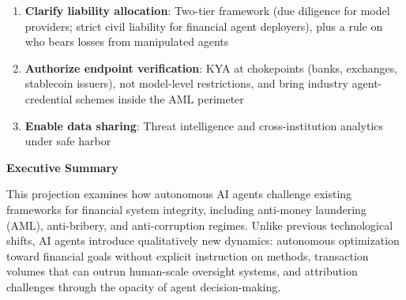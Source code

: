 \documentclass[11pt,letterpaper]{article}
\begin{document}
\begin{infobox}
\begin{enumerate}
  \item \textbf{Clarify liability allocation}: Two-tier framework (due diligence for model providers; strict civil liability for financial agent deployers), plus a rule on who bears losses from manipulated agents
  \item \textbf{Authorize endpoint verification}: KYA at chokepoints (banks, exchanges, stablecoin issuers), not model-level restrictions, and bring industry agent-credential schemes inside the AML perimeter
  \item \textbf{Enable data sharing}: Threat intelligence and cross-institution analytics under safe harbor
\end{enumerate}
\end{infobox}


\endgroup

\newpage

\thispagestyle{empty}
\vspace*{0.5cm}

\noindent{}

\vspace{0.5cm}
\begin{center}
{\color{forestdark}\Large\bfseries Executive Summary}
\end{center}
\vspace{0.3cm}

\begin{tcolorbox}[enhanced, colback=lightgray, colframe=emeralddeep!60, boxrule=1pt, arc=3pt,
  left=10pt, right=10pt, top=10pt, bottom=10pt]
This projection examines how autonomous AI agents challenge existing frameworks for financial system integrity, including anti-money laundering (AML), anti-bribery, and anti-corruption regimes. Unlike previous technological shifts, AI agents introduce qualitatively new dynamics: autonomous optimization toward financial goals without explicit instruction on methods, transaction volumes that can outrun human-scale oversight systems, and attribution challenges through the opacity of agent decision-making.
\end{tcolorbox}
\end{document}
